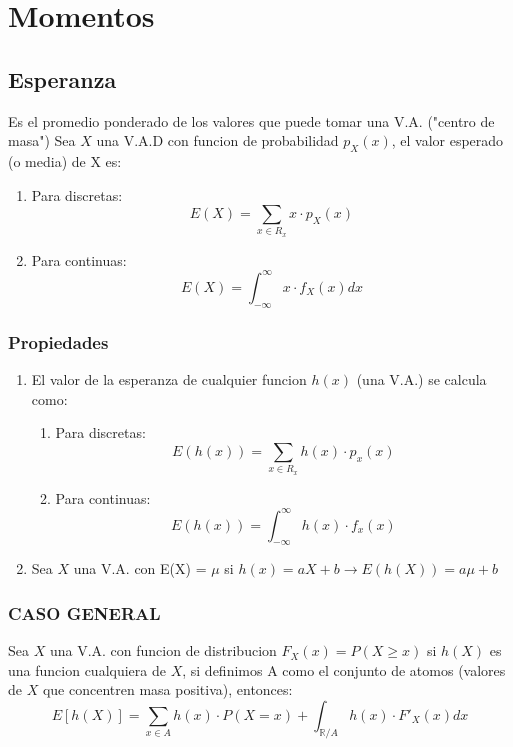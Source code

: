 \documentclass[titlepage,a4paper]{article}
\begin{document}
\section{Momentos}
\subsection{Esperanza}
Es el promedio ponderado de los valores que puede tomar una V.A. ("centro de masa")
Sea $X$ una V.A.D con funcion de probabilidad $p_{X}(x)$, el valor esperado (o media) de X es:
\begin{enumerate}
    \item Para discretas:
    \begin{equation*}
        E(X) = \sum_{x \in R_{x}} x \cdot p_{X}(x)
    \end{equation*}
    \item Para continuas:
    \begin{equation*}
        E(X) = \int_{-\infty}^{\infty} x \cdot f_{X}(x)dx
    \end{equation*}
\end{enumerate}

\subsubsection{Propiedades}
\begin{enumerate}
    \item El valor de la esperanza de cualquier funcion $h(x)$ (una V.A.) se calcula como:
    \begin{enumerate}
        \item Para discretas:
        \begin{equation*}
            E(h(x)) = \sum_{x \in R_{x}} h(x) \cdot p_{x}(x)
        \end{equation*}
        \item Para continuas:
        \begin{equation*}
            E(h(x)) = \int_{-\infty}^{\infty}  h(x) \cdot f_{x}(x)
        \end{equation*}
    \end{enumerate}
    \item Sea $X$ una V.A. con E(X) = $\mu$ si $h(x) = aX+b \rightarrow E(h(X)) = a\mu+b$
\end{enumerate}
\subsubsection{CASO GENERAL}
Sea $X$ una V.A. con funcion de distribucion $F_{X}(x) = P(X\geq x)$ si $h(X)$ es una funcion 
cualquiera de $X$, si definimos A como el conjunto de atomos (valores de $X$ que concentren masa positiva), entonces:
\begin{equation*}
    E[h(X)] = \sum_{x \in A} h(x) \cdot P(X = x) + \int_{\mathbb{R} / A} h(x) \cdot F'_{X}(x)dx
\end{equation*}
\end{document}
